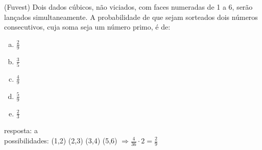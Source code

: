 \begin{ex}
(Fuvest) Dois dados cúbicos, não viciados, com faces numeradas de 1 a 6, serão lançados simultaneamente. A probabilidade de que sejam sorteados dois números consecutivos, cuja soma seja um número primo, é de:
   \begin{enumerate}[(a)]
   \item $\frac{2}{9}$
   \item $\frac{3}{5}$
   \item $\frac{4}{9}$
   \item $\frac{5}{9}$
   \item $\frac{2}{3}$
   \end{enumerate}
     \begin{sol}
     resposta: a \\
     possibilidades: (1,2) (2,3) (3,4) (5,6) $\Longrightarrow \frac{4}{36}\cdot 2=\frac{2}{9}$
     \end{sol}
\end{ex}